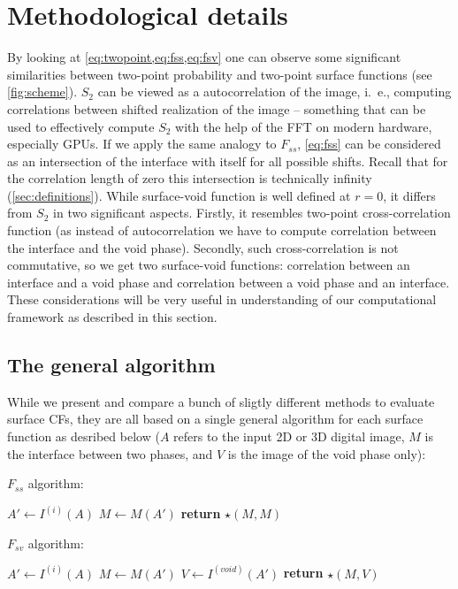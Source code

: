 \documentclass[reprint,amsmath,amssymb,aps,pre,showkeys,showpacs]{revtex4-1}
\begin{document}
\section{Methodological details}
\label{sec:details}
By looking at \cref{eq:twopoint,eq:fss,eq:fsv} one can observe
some significant similarities between two-point probability and two-point
surface functions (see \cref{fig:scheme}). $S_2$ can be viewed as a
autocorrelation of the image, i.~e., computing correlations between shifted
realization of the image -- something that can be used to effectively compute
$S_2$ with the help of the FFT on modern hardware, especially GPUs. If we apply
the same analogy to $F_{ss}$, \cref{eq:fss} can be considered as an intersection
of the interface with itself for all possible shifts. Recall that for the
correlation length of zero this intersection is technically infinity
(\cref{sec:definitions}). While surface-void function is well defined at $r=0$,
it differs from $S_2$ in two significant aspects. Firstly, it resembles two-point
cross-correlation function (as instead of autocorrelation we have to compute
correlation between the interface and the void phase). Secondly, such
cross-correlation is not commutative, so we get two surface-void functions:
correlation between an interface and a void phase and correlation between a void
phase and an interface. These considerations will be very useful in
understanding of our computational framework as described in this section.

\subsection{The general algorithm}
\label{sec:general}
While we present and compare a bunch of sligtly different methods to evaluate
surface CFs, they are all based on a single general algorithm for each surface
function as desribed below ($A$ refers to the input 2D or 3D digital image, $M$
is the interface between two phases, and $V$ is the image of the void phase only):

$F_{ss}$ algorithm:
\begin{algorithmic}[1]
  \State $A' \gets I^{(i)}(A)$
  \State $M \gets M(A')$
  \State \textbf{return} $\star(M, M)$
  \EndProcedure
\end{algorithmic}

$F_{sv}$ algorithm:
\begin{algorithmic}[1]
  \State $A' \gets I^{(i)}(A)$
  \State $M \gets M(A')$
  \State $V \gets I^{(void)}(A')$
  \State \textbf{return} $\star(M, V)$
  \EndProcedure
\end{algorithmic}
\end{document}
